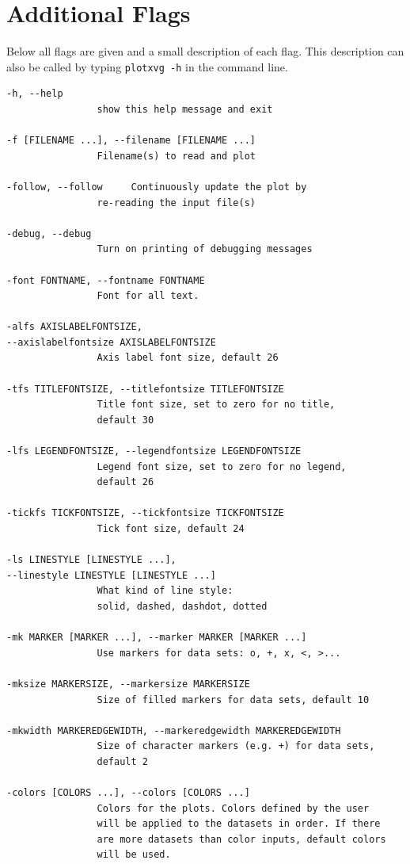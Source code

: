 \clearpage
\section{Additional Flags}
Below all flags are given and a small description of each flag. This description can also be called by typing \texttt{plotxvg -h} in the command line.

\begin{verbatim}
-h, --help            
                show this help message and exit

-f [FILENAME ...], --filename [FILENAME ...]
                Filename(s) to read and plot

-follow, --follow     Continuously update the plot by 
                re-reading the input file(s)

-debug, --debug       
                Turn on printing of debugging messages

-font FONTNAME, --fontname FONTNAME
                Font for all text.

-alfs AXISLABELFONTSIZE, 
--axislabelfontsize AXISLABELFONTSIZE
                Axis label font size, default 26

-tfs TITLEFONTSIZE, --titlefontsize TITLEFONTSIZE
                Title font size, set to zero for no title,
                default 30

-lfs LEGENDFONTSIZE, --legendfontsize LEGENDFONTSIZE
                Legend font size, set to zero for no legend,
                default 26

-tickfs TICKFONTSIZE, --tickfontsize TICKFONTSIZE
                Tick font size, default 24

-ls LINESTYLE [LINESTYLE ...], 
--linestyle LINESTYLE [LINESTYLE ...]
                What kind of line style: 
                solid, dashed, dashdot, dotted

-mk MARKER [MARKER ...], --marker MARKER [MARKER ...]
                Use markers for data sets: o, +, x, <, >...

-mksize MARKERSIZE, --markersize MARKERSIZE
                Size of filled markers for data sets, default 10

-mkwidth MARKEREDGEWIDTH, --markeredgewidth MARKEREDGEWIDTH
                Size of character markers (e.g. +) for data sets, 
                default 2

-colors [COLORS ...], --colors [COLORS ...] 
                Colors for the plots. Colors defined by the user
                will be applied to the datasets in order. If there 
                are more datasets than color inputs, default colors 
                will be used.


\end{verbatim}
